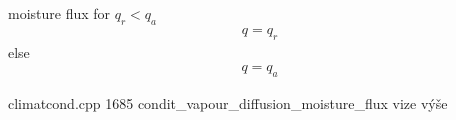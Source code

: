 moisture flux for $q_r<q_a$
\begin{eqnarray}
q = q_r
\end{eqnarray}
else
\begin{eqnarray}
q = q_a
\end{eqnarray}


climatcond.cpp 1685
condit\_vapour\_diffusion\_moisture\_flux
vize v\'{y}\v{s}e

\begin{eqnarray}
\end{eqnarray}
\begin{eqnarray}
\end{eqnarray}
\begin{eqnarray}
\end{eqnarray}
\begin{eqnarray}
\end{eqnarray}
\begin{eqnarray}
\end{eqnarray}
\begin{eqnarray}
\end{eqnarray}
\begin{eqnarray}
\end{eqnarray}
